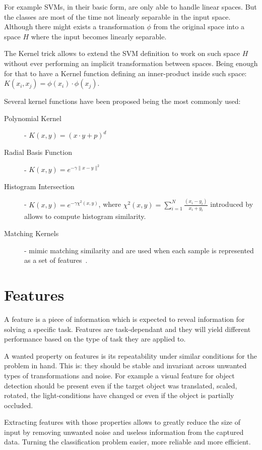 For example \glspl{SVM}, in their basic form, are only able to handle linear spaces.
But the classes are most of the time not linearly separable in the input
space. Although there might exists a transformation $\phi$ from the original
space into a space $H$ where the input becomes linearly separable.

The Kernel trick allows to extend the \gls{SVM} definition to work on such space
$H$ without ever performing an implicit transformation between spaces. Being
enough for that to have a Kernel function defining an inner-product inside such
space: $K(x_i, x_j) = \phi(x_i)\cdot\phi(x_j)$.

Several kernel functions have been proposed being the most commonly used:

\begin{description}
\item[Polynomial Kernel] - $K(x, y) = (x \cdot y + p)^d$
\item[Radial Basis Function] - $K(x, y) = e^{-\gamma\|x - y \|^2}$
\item[Histogram Intersection] - $K(x, y) = e^{-\gamma \chi^2(x,y)}$, where
$\chi^2(x,y) = \sum_{i=1}^{N}\frac{(x_i-y_i)}{x_i+y_i}$ introduced by
\cite{barla2003histogram} allows to compute histogram similarity.
\item[Matching Kernels] - mimic matching similarity and are used when each
sample is represented as a set of features~\citep{boughorbel2005intermediate}.
\end{description}


\section{Features}
A feature is a piece of information which is expected to reveal information for
solving a specific task. Features are task-dependant and they will
yield different performance based on the type of task they are applied to.

A wanted property on features is its repeatability under similar conditions for
the problem in hand. This is: they should be stable and invariant across
unwanted types of transformations and noise. For example a visual feature for
object detection should be present even if the target object was translated,
scaled, rotated, the light-conditions have changed or even if the object is
partially occluded.

Extracting features with those properties allows to greatly reduce the size of
input by removing unwanted noise and useless information from the captured data.
Turning the classification problem easier, more reliable and more efficient.

